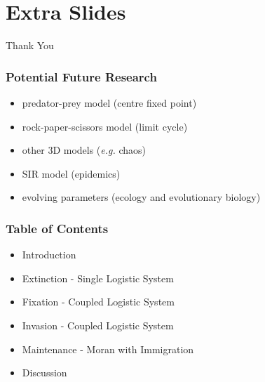 \documentclass[dvipsnames]{beamer}
\begin{document}


\section*{Extra Slides}

\begin{frame}
\centering
{{\Huge Thank You}}
\end{frame}


\begin{frame}
\frametitle{Potential Future Research}
\Large{
	\begin{itemize}
		\item predator-prey model (centre fixed point)
		\item rock-paper-scissors model (limit cycle)
		\item other 3D models (\emph{e.g.} chaos)
		\item SIR model (epidemics)
		\item evolving parameters (ecology and evolutionary biology)
	\end{itemize}
}
\end{frame}



\begin{frame}
\frametitle{Table of Contents}
\begin{itemize}
	\item Introduction
	\item Extinction - Single Logistic System%
	\item Fixation - Coupled Logistic System%
	\item Invasion - Coupled Logistic System%
	\item Maintenance - Moran with Immigration
	\item Discussion
\end{itemize}
\end{frame}
\end{document}
